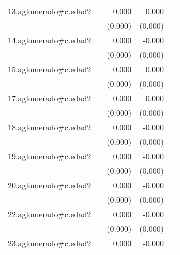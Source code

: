 {\begin{longtable}{l*{4}{D{.}{.}{-1}}}
\addlinespace
13.aglomerado#c.edad2&                     &       0.000         &       0.000         &                     \\
            &                     &     (0.000)         &     (0.000)         &                     \\
\addlinespace
14.aglomerado#c.edad2&                     &       0.000         &      -0.000         &                     \\
            &                     &     (0.000)         &     (0.000)         &                     \\
\addlinespace
15.aglomerado#c.edad2&                     &       0.000         &       0.000         &                     \\
            &                     &     (0.000)         &     (0.000)         &                     \\
\addlinespace
17.aglomerado#c.edad2&                     &       0.000\sym{*}  &       0.000\sym{*}  &                     \\
            &                     &     (0.000)         &     (0.000)         &                     \\
\addlinespace
18.aglomerado#c.edad2&                     &       0.000         &      -0.000         &                     \\
            &                     &     (0.000)         &     (0.000)         &                     \\
\addlinespace
19.aglomerado#c.edad2&                     &       0.000         &      -0.000         &                     \\
            &                     &     (0.000)         &     (0.000)         &                     \\
\addlinespace
20.aglomerado#c.edad2&                     &       0.000         &      -0.000         &                     \\
            &                     &     (0.000)         &     (0.000)         &                     \\
\addlinespace
22.aglomerado#c.edad2&                     &       0.000         &      -0.000         &                     \\
            &                     &     (0.000)         &     (0.000)         &                     \\
\addlinespace
23.aglomerado#c.edad2&                     &       0.000         &      -0.000         &                     \\

\end{longtable}}
